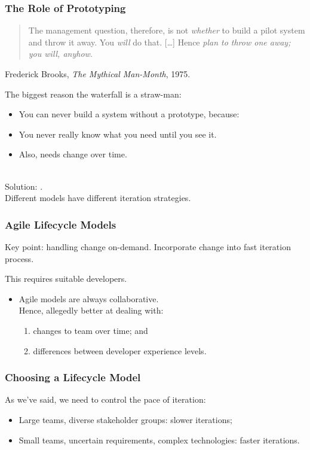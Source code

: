 \begin{frame}
\frametitle{The Role of Prototyping}

\begin{changemargin}{1cm}
\begin{quote}
The management question, therefore, is not {\em whether} to build a pilot system and throw it away. You {\em will} do that. [\ldots] Hence {\em plan to throw one away; you will, anyhow}.
\end{quote}
\hfill Frederick Brooks, \emph{The Mythical Man-Month}, 1975.
~

The biggest reason the waterfall is a straw-man: 
\begin{itemize}
\item You can never build a system without a prototype, because:
\item You never really know what you need until you see it.
\item Also, needs change over time.
\end{itemize}
~\\

Solution: .\\Different models have different iteration strategies.

\end{changemargin}
\end{frame}

\begin{frame}
\frametitle{Agile Lifecycle Models}

\begin{changemargin}{1cm}
Key point: handling change on-demand.
Incorporate change into fast iteration process.

This requires suitable developers.
\begin{itemize}
\item Agile models are always collaborative.\\
 Hence, allegedly better at dealing with:
\begin{enumerate}
\item changes to team over time; and
\item differences between developer experience levels.
\end{enumerate}
\end{itemize}

\end{changemargin}
\end{frame}


\begin{frame}
\frametitle{Choosing a Lifecycle Model}

\begin{changemargin}{1cm}
As we've said, we need to control the pace of iteration:
\begin{itemize}
\item Large teams, diverse stakeholder groups: slower iterations;
\item Small teams, uncertain requirements, complex technologies: faster iterations.
\end{itemize}
\end{changemargin}

\end{frame}


